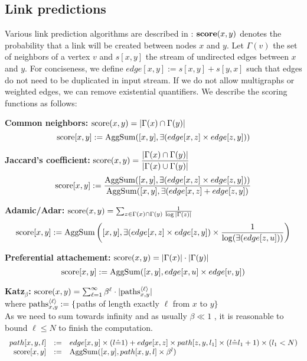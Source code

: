 \documentclass[11pt]{article}
\begin{document}
\subsection{Link predictions}
Various link prediction algorithms are described in \cite{linkpred}: ${\bf score}(x,y)$ denotes the probability that a link will be created between nodes $x$ and $y$. Let $\Gamma(v)$ the set of neighbors of a vertex $v$ and $s[x,y]$ the stream of undirected edges between $x$ and $y$. For conciseness, we define $edge[x,y] := s[x,y]+s[y,x]$ such that edges do not need to be duplicated in input stream. If we do not allow multigraphs or weighted edges, we can remove existential quantifiers. We describe the scoring functions as follows:

{\bf Common neighbors:} ${\rm score}(x,y)=|\Gamma(x) \cap \Gamma(y)|$
\[{\rm score}[x,y] := {\rm AggSum}([x,y], \exists(edge[x,z] \times edge[z,y]))\]

{\bf Jaccard's coefficient:} ${\rm score}(x,y)=\dfrac{|\Gamma(x) \cap \Gamma(y)|}{|\Gamma(x) \cup \Gamma(y)|}$
\[{\rm score}[x,y] := \dfrac{{\rm AggSum}([x,y], \exists(edge[x,z] \times edge[z,y]))}
					{{\rm AggSum}([x,y], \exists(edge[x,z] + edge[z,y])}\]

{\bf Adamic/Adar:} ${\rm score}(x,y)=\sum_{z\in \Gamma(x) \cap \Gamma(y)}\frac{1}{\log|\Gamma(z)|}$
\[{\rm score}[x,y] := {\rm AggSum}\left([x,y], \exists(edge[x,z]\times edge[z,y])  \times \dfrac{1}{\log(\exists(edge[z,u]))}\right)\]

{\bf Preferential attachement:} ${\rm score}(x,y)=|\Gamma(x)| \cdot |\Gamma(y)|$
\[{\rm score}[x,y] := {\rm AggSum}([x,y], edge[x,u] \times edge[v,y])\]

{\bf Katz${}_{\beta}$:} ${\rm score}(x,y)=\sum_{\ell=1}^{\infty} \beta^\ell \cdot |{\rm paths}_{x,y}^{\langle\ell\rangle}|$ \\where ${\rm paths}_{x,y}^{\langle\ell\rangle} := \{$paths of length exactly $\ell$ from $x$ to $y\}$\\
As we need to sum towards infinity and as usually $\beta \ll 1$ \cite{linkpred}, it is reasonable to bound $\ell \le N$ to finish the computation.
\[\begin{array}{rcl}
path[x,y,l] &:=& edge[x,y] \times (l\hat=1) +  edge[x,z] \times path[z,y,l_1] \times (l\hat= l_1+1) \times (l_1<N)\\
{\rm score}[x,y] &:=& {\rm AggSum}([x,y], path[x,y,l] \times \beta^l )
\end{array}\]
\end{document}
